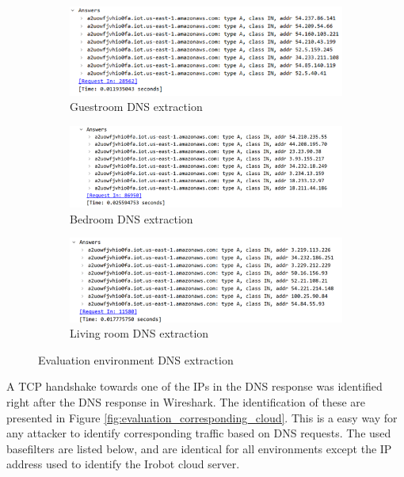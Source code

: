 \begin{figure}[H]
    \centering
    \begin{subfigure}{0.9\textwidth}
        \centering
        \includegraphics[width=\linewidth]{figures/Evaluation_dns_extraction 1.png}
        \caption{Guestroom DNS extraction}
        \label{fig:Evaluation_DNSextraction_1}
    \end{subfigure}
    \hfill
    \begin{subfigure}{0.9\textwidth}
        \centering
        \includegraphics[width=\linewidth]{figures/Evaluation_dns_extraction 2.png}
        \caption{Bedroom DNS extraction}
        \label{fig:Evaluation_DNSextraction_2}
    \end{subfigure}
    \hfill
    \begin{subfigure}{0.9\textwidth}
        \centering
        \includegraphics[width=\linewidth]{figures/Evaluation_dns_extraction 3.png}
        \caption{Living room DNS extraction}
        \label{fig:Evaluation_DNSextraction_3}
    \end{subfigure}
    \caption{Evaluation environment DNS extraction}
    \label{fig:Evaluation_DNSExtraction}
\end{figure}

 A \gls{TCP} handshake towards one of the \gls{IP}s in the \gls{DNS} response was identified right after the \gls{DNS} response in Wireshark. The identification of these are presented in Figure \ref{fig:evaluation_corresponding_cloud}. This is a easy way for any attacker to identify corresponding traffic based on \gls{DNS} requests. The used basefilters are listed below, and are identical for all environments except the \gls{IP} address used to identify the Irobot cloud server. 

